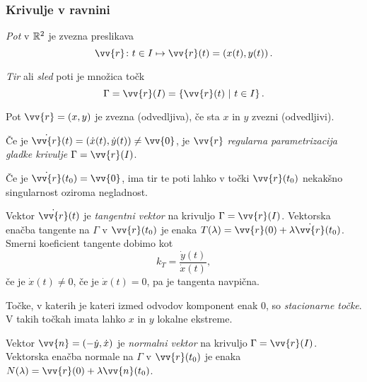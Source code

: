 \documentclass[12pt, a4paper]{article}
\begin{document}
\subsubsection{Krivulje v ravnini}

\begin{definicija}
\emph{Pot} v $\mathbb{R}^2$ je zvezna preslikava
\[
\vv{r}\colon t\in I\mapsto\vv{r}(t)=\left(x(t),y(t)\right).
\]
\end{definicija}

\begin{definicija}
\emph{Tir}
 ali \emph{sled} poti je množica točk
\[
\Gamma=\vv{r}(I)=\setb{\vv{r}(t)}{t\in I}.
\]
\end{definicija}

\begin{definicija}
Pot $\vv{r}=(x,y)$ je zvezna (odvedljiva), če sta $x$ in $y$ zvezni (odvedljivi).
\end{definicija}

\begin{definicija}
Če je $\dot{\vv{r}}(t)=(\dot{x}(t),\dot{y}(t))\ne\vv{0}$, je $\vv{r}$ \emph{regularna parametrizacija gladke krivulje} $\Gamma=\vv{r}(I)$.
\end{definicija}

\begin{opomba}
Če je $\dot{\vv{r}}(t_0)=\vv{0}$, ima tir te poti lahko v točki $\vv{r}(t_0)$ nekakšno singularnost oziroma negladnost.
\end{opomba}

\begin{definicija}
Vektor $\dot{\vv{r}}(t)$ je \emph{tangentni vektor} na krivuljo $\Gamma=\vv{r}(I)$. Vektorska enačba tangente na $\Gamma$ v $\vv{r}(t_0)$ je enaka $T(\lambda)=\vv{r}(0)+\lambda\dot{\vv{r}}(t_0)$. Smerni koeficient tangente dobimo kot
\[
k_T=\frac{\dot{y}(t)}{\dot{x}(t)},
\]
če je $\dot{x}(t)\ne 0$, če je $\dot{x}(t)=0$, pa je tangenta navpična.
\end{definicija}

\begin{definicija}
Točke, v katerih je kateri izmed odvodov komponent enak $0$, so \emph{stacionarne točke}. V takih točkah imata lahko $x$ in $y$ lokalne ekstreme.
\end{definicija}

\begin{definicija}
Vektor $\vv{n}=(-\dot{y},\dot{x})$ je \emph{normalni vektor} na krivuljo $\Gamma=\vv{r}(I)$. Vektorska enačba normale na $\Gamma$ v $\vv{r}(t_0)$ je enaka $N(\lambda)=\vv{r}(0)+\lambda\vv{n}(t_0)$.
\end{definicija}
\end{document}
